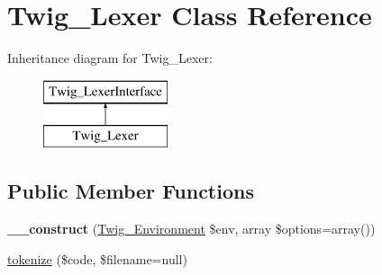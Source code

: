 \hypertarget{class_twig___lexer}{}\section{Twig\+\_\+\+Lexer Class Reference}
\label{class_twig___lexer}
Inheritance diagram for Twig\+\_\+\+Lexer\+:\begin{figure}[H]
\begin{center}
\leavevmode
\includegraphics[height=2.000000cm]{class_twig___lexer}
\end{center}
\end{figure}
\subsection*{Public Member Functions}
\begin{DoxyCompactItemize}
\item 
\hypertarget{class_twig___lexer_ab85dfd54ab416c689e2df82e0b783cc1}{}{\bfseries \+\_\+\+\_\+construct} (\hyperlink{class_twig___environment}{Twig\+\_\+\+Environment} \$env, array \$options=array())\label{class_twig___lexer_ab85dfd54ab416c689e2df82e0b783cc1}

\item 
\hyperlink{class_twig___lexer_a8db0ea9f7a98bc3fd2ba77126ab20491}{tokenize} (\$code, \$filename=null)
\end{DoxyCompactItemize}
